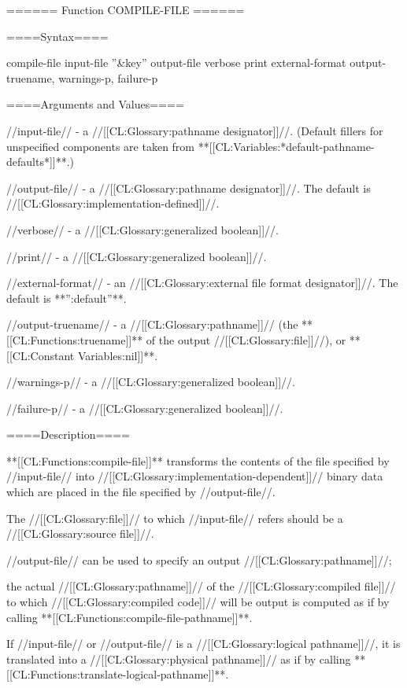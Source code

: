 ====== Function COMPILE-FILE ======

====Syntax====

\DefunWithValuesNewline compile-file {input-file ''&key'' output-file verbose print external-format} {output-truename, warnings-p, failure-p}

====Arguments and Values====

//input-file// - a //[[CL:Glossary:pathname designator]]//. (Default fillers for unspecified components are taken from **[[CL:Variables:*default-pathname-defaults*]]**.)

//output-file// - a //[[CL:Glossary:pathname designator]]//. The default is //[[CL:Glossary:implementation-defined]]//.

//verbose// - a //[[CL:Glossary:generalized boolean]]//. 

//print// - a //[[CL:Glossary:generalized boolean]]//. 

//external-format// - an //[[CL:Glossary:external file format designator]]//. The default is **'':default''**.

//output-truename// - a //[[CL:Glossary:pathname]]// (the **[[CL:Functions:truename]]** of the output //[[CL:Glossary:file]]//), or **[[CL:Constant Variables:nil]]**.

//warnings-p// - a //[[CL:Glossary:generalized boolean]]//.

//failure-p// - a //[[CL:Glossary:generalized boolean]]//.



====Description====

**[[CL:Functions:compile-file]]** transforms the contents of the file specified by //input-file// into //[[CL:Glossary:implementation-dependent]]// binary data which are placed in the file specified by //output-file//.

The //[[CL:Glossary:file]]// to which //input-file// refers should be a //[[CL:Glossary:source file]]//.

//output-file// can be used to specify an output //[[CL:Glossary:pathname]]//;

the actual //[[CL:Glossary:pathname]]// of the //[[CL:Glossary:compiled file]]// to which //[[CL:Glossary:compiled code]]// will be output is computed as if by calling **[[CL:Functions:compile-file-pathname]]**.

If //input-file// or //output-file// is a //[[CL:Glossary:logical pathname]]//, it is translated into a //[[CL:Glossary:physical pathname]]// as if by calling **[[CL:Functions:translate-logical-pathname]]**.

